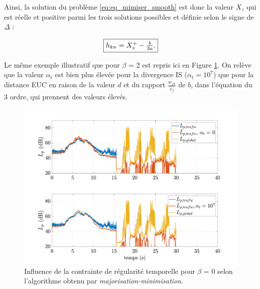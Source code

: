 Ainsi, la solution du problème \ref{eq:eq_mimiser_smooth} est donc la valeur $X_z$ qui est réelle et positive parmi les trois solutions possibles et définie selon le signe de $\Delta$ : 

\begin{equation}
\fbox{$
h_{kn} = X_{z}^+-\frac{b}{3a}.
$}
\end{equation}

Le même exemple illustratif que pour $\beta$ = 2 est repris ici en Figure \ref{fig:smooth_0}. On relève que la valeur $\alpha_t$ est bien plus élevée pour la divergence IS ($\alpha_t = 10^7$) que pour la distance EUC en raison de la valeur $d$ et du rapport $\frac{w_{fk}}{\tilde{v}_f}$ de $b$, dans l'équation du 3\ieme{} ordre, qui prennent des valeurs élevés.

\begin{figure}[h]
\centering
\includegraphics[width=.9\linewidth]{./figures/NMF/LpSmooth_0.pdf}
\caption{Influence de la contrainte de régularité temporelle pour $\beta$ = 0 selon l'algorithme obtenu par \textit{majorisation-minimisation}.}
\label{fig:smooth_0}
\end{figure}
